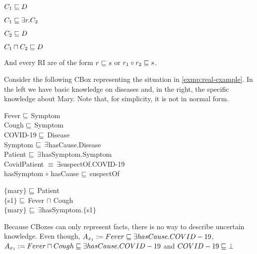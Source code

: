 \begin{enumerate*}[itemjoin = {\hskip 0.8in}]
  \item $C_1 \sqsubseteq D$
  \item $C_1 \sqsubseteq \exists r.C_2$
  \item $C_2 \sqsubseteq D$
  \item $C_1 \sqcap C_2 \sqsubseteq D$
\end{enumerate*}

And every RI are of the form $r \sqsubseteq s$ or $r_1 \circ r_2 \sqsubseteq s$.

\begin{example}
  Consider the following CBox representing the situation in \autoref{exmp:real-example}. In the left we have basic knowledge on diseases and, in the right, the specific knowledge about Mary. Note that, for simplicity, it is not in normal form.

  {
    \sffamily
    \begin{center}
        \begin{minipage}{0,4\textwidth}
                \fontsize{10}{14}
                \selectfont
                Fever $\sqsubseteq$ Symptom\\
                Cough $\sqsubseteq$ Symptom\\
                COVID-19 $\sqsubseteq$ Disease\\
                Symptom $\sqsubseteq \, \exists$hasCause.Disease\\
                Patient $\sqsubseteq\, \exists$hasSymptom.Symptom\\
                CovidPatient $\equiv\, \exists$suspectOf.COVID-19\\
                hasSymptom $\circ$ hasCause $\sqsubseteq$ suspectOf\\
        \end{minipage}
        \hspace{10pt}
        \begin{minipage}{0,4\textwidth}
                \fontsize{10}{14}
                \selectfont
                $\{$mary$\}$ $\sqsubseteq$ Patient\\
                $\{$s1$\}$ $\sqsubseteq$ Fever $\sqcap$ Cough\\
                $\{$mary$\}$ $\sqsubseteq \, \exists$hasSymptom.$\{$s1$\}$\\
        \end{minipage}
    \end{center} 
  }

  Because CBoxes can only represent facts, there is no way to describe uncertain knowledge. Even though, $A_{x_1} := Fever \sqsubseteq \exists hasCause.COVID-19$, $A_{x_1} := Fever \sqcap Cough \sqsubseteq \exists hasCause.COVID-19$  and $COVID-19 \sqsubseteq \bot$
\end{example}

